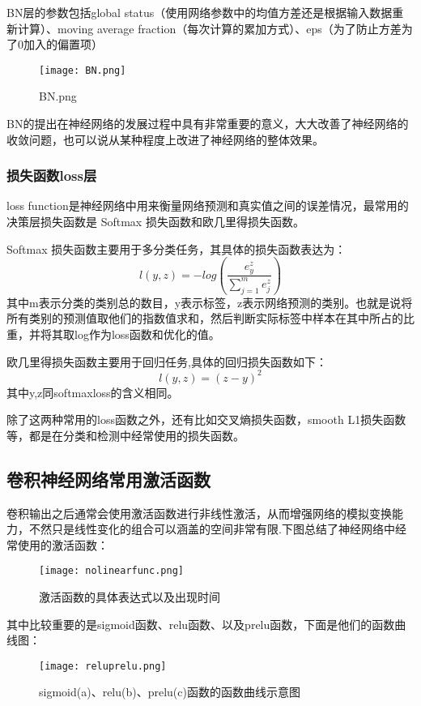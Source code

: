 BN层的参数包括global status（使用网络参数中的均值方差还是根据输入数据重新计算）、moving average fraction（每次计算的累加方式）、eps（为了防止方差为了0加入的偏置项）
\begin{figure}[!ht]
 \centering
	\texttt{[image: BN.png]}
	\caption{BN.png}
\end{figure}

BN的提出在神经网络的发展过程中具有非常重要的意义，大大改善了神经网络的收敛问题，也可以说从某种程度上改进了神经网络的整体效果。
\subsubsection{损失函数loss层}
loss function是神经网络中用来衡量网络预测和真实值之间的误差情况，最常用的决策层损失函数是 Softmax 损失函数和欧几里得损失函数。

Softmax 损失函数主要用于多分类任务，其具体的损失函数表达为：
\begin{equation}{
l(y,z)=-log\left (  \frac{e^z_y}{\sum_{j=1}^{m} e^z_j} \right )
}
\end{equation}
其中m表示分类的类别总的数目，y表示标签，z表示网络预测的类别。也就是说将所有类别的预测值取他们的指数值求和，然后判断实际标签中样本在其中所占的比重，并将其取log作为loss函数和优化的值。

欧几里得损失函数主要用于回归任务,具体的回归损失函数如下：
\begin{equation}{
l(y,z)=(z-y)^2
}
\end{equation}
其中y,z同softmaxloss的含义相同。

除了这两种常用的loss函数之外，还有比如交叉熵损失函数，smooth L1损失函数等，都是在分类和检测中经常使用的损失函数。

\subsection{卷积神经网络常用激活函数}
卷积输出之后通常会使用激活函数进行非线性激活，从而增强网络的模拟变换能力，不然只是线性变化的组合可以涵盖的空间非常有限.下图总结了神经网络中经常使用的激活函数：
\begin{figure}[!ht]
 \centering
	\texttt{[image: nolinearfunc.png]}
	\caption{激活函数的具体表达式以及出现时间}
\end{figure}

其中比较重要的是sigmoid函数、relu函数、以及prelu函数，下面是他们的函数曲线图：
\begin{figure}[!ht]
 \centering
	\texttt{[image: reluprelu.png]}
	\caption{sigmoid(a)、relu(b)、prelu(c)函数的函数曲线示意图}
\end{figure}

